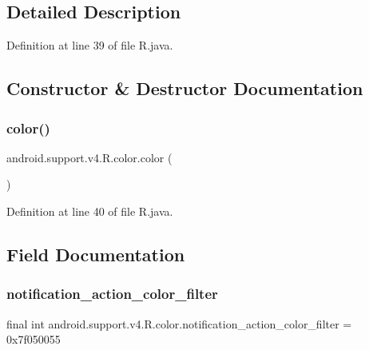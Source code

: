 \subsection{Detailed Description}


Definition at line 39 of file R.\+java.



\subsection{Constructor \& Destructor Documentation}
\mbox{\label{classandroid_1_1support_1_1v4_1_1_r_1_1color_a67527abc01aa30286b974dc8f77e4bfc}} 
\subsubsection{\texorpdfstring{color()}{color()}}
{\footnotesize\ttfamily android.\+support.\+v4.\+R.\+color.\+color (\begin{DoxyParamCaption}{ }\end{DoxyParamCaption})\hspace{0.3cm}{\ttfamily [private]}}



Definition at line 40 of file R.\+java.


\begin{DoxyCode}{0}

\end{DoxyCode}


\subsection{Field Documentation}
\mbox{\label{classandroid_1_1support_1_1v4_1_1_r_1_1color_a0e6bd1dee1ba3fbdaf9466f8716e4724}} 
\subsubsection{\texorpdfstring{notification\_action\_color\_filter}{notification\_action\_color\_filter}}
{\footnotesize\ttfamily final int android.\+support.\+v4.\+R.\+color.\+notification\+\_\+action\+\_\+color\+\_\+filter = 0x7f050055\hspace{0.3cm}{\ttfamily [static]}}



